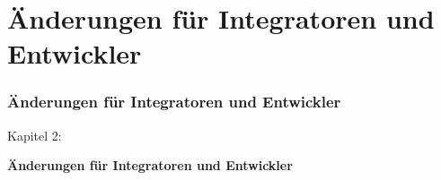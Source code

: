 %

\section{Änderungen für Integratoren und Entwickler}
\begin{frame}[fragile]
	\frametitle{Änderungen für Integratoren und Entwickler}

	\begin{center}\huge{Kapitel 2:}\end{center}
	\begin{center}\huge{\color{typo3darkgrey}\textbf{Änderungen für Integratoren und Entwickler}}\end{center}

\end{frame}

